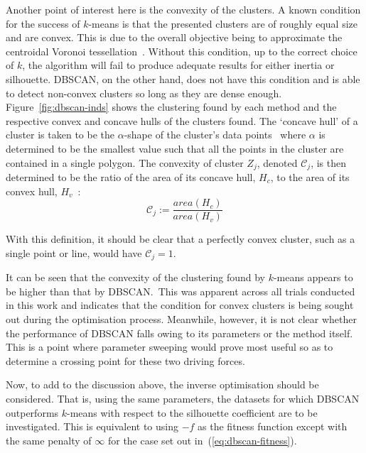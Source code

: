 \documentclass[smallextended]{svjour3}
\begin{document}
Another point of interest here is the convexity of the clusters. A known
condition for the success of \(k\)-means is that the presented clusters are of
roughly equal size and are convex. This is due to the overall objective being to
approximate the centroidal Voronoi tessellation~\cite{Du2006}. Without this
condition, up to the correct choice of \(k\), the algorithm will fail to produce
adequate results for either inertia or silhouette. DBSCAN, on the other hand,
does not have this condition and is able to detect non-convex clusters so long
as they are dense enough. Figure~\ref{fig:dbscan-inds} shows the clustering
found by each method and the respective convex and concave hulls of the clusters
found. The `concave hull' of a cluster is taken to be the \(\alpha\)-shape of
the cluster's data points~\cite{Edelsbrunner1983} where \(\alpha\) is determined
to be the smallest value such that all the points in the cluster are contained
in a single polygon. The convexity of cluster \(Z_j\), denoted
\(\mathcal{C}_j\), is then determined to be the ratio of the area of its concave
hull, \(H_c\), to the area of its convex hull, \(H_v\)~\cite{Sonka1993}:
\begin{equation}
    \mathcal{C}_j := \frac{area(H_c)}{area(H_v)}
\end{equation}

With this definition, it should be clear that a perfectly convex cluster, such
as a single point or line, would have \(\mathcal{C}_j = 1\).

It can be seen that the convexity of the clustering found by \(k\)-means appears
to be higher than that by DBSCAN.\ This was apparent across all trials conducted
in this work and indicates that the condition for convex clusters is being
sought out during the optimisation process. Meanwhile, however, it is not clear
whether the performance of DBSCAN falls owing to its parameters or the method
itself. This is a point where parameter sweeping would prove most useful so as
to determine a crossing point for these two driving forces.

Now, to add to the discussion above, the inverse optimisation should be
considered. That is, using the same parameters, the datasets for which DBSCAN
outperforms \(k\)-means with respect to the silhouette coefficient are to be
investigated. This is equivalent to using \(-f\) as the fitness function
except with the same penalty of \(\infty\) for the case set out
in~(\ref{eq:dbscan-fitness}).
\end{document}
